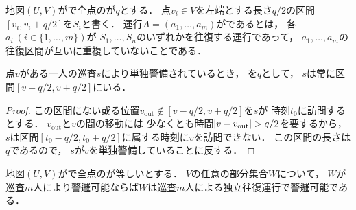 \begin{defi}
  \label{defi:independentSectionOperation}
  地図$(U, V)$が{\graphLine}で全点の{\maxIdletime}が$q$とする．
  点$v_i \in V$を左端とする長さ$q/2$の区間$[v_i, v_i + q/2]$を$S_i$と書く．
  運行$A = (a_1, \ldots, a_m)$がであるとは，
  各$a_i\ (i \in \{ 1, \ldots, m \})$が
  $S_1, \ldots, S_n$のいずれかを往復する運行であって，
  $a_1, \ldots, a_m$の往復区間が互いに重複していないことである．
\end{defi}


\begin{lemm}
  \label{lemm:RangeOfPatrollerOnLine}
  点$v$がある一人の巡査$s$により単独警備されているとき，
  {\maxIdletime}を$q$として，
  $s$は常に区間$[v - q/2, v + q/2]$にいる．
\end{lemm}
\begin{proof}
  \newcommand{\vout}{v_{\mathrm{out}}}
  この区間にない或る位置$\vout \notin [v - q/2, v + q/2]$を$s$が
  時刻$t_0$に訪問するとする．
  $\vout$と$v$の間の移動には
  少なくとも時間$\abs{v - \vout} > q / 2$を要するから，
  $s$は区間$[t_0 - q / 2, t_0 + q / 2]$に属する時刻に$v$を訪問できない．
  この区間の長さは$q$であるので，
  $s$が$v$を単独警備していることに反する．
\end{proof}


\begin{lemm}
  \label{lemm:LineUnaryIdletimeIndependentInterval}
  地図$(U, V)$が{\graphLine}で全点の{\maxIdletime}が等しいとする．
  $V$の任意の部分集合$W$について，
  $W$が巡査$m$人により警邏可能ならば$W$は巡査$m$人による独立往復運行で警邏可能である．
\end{lemm}

